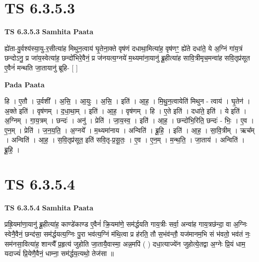 \documentclass[17pt]{extarticle}
\begin{document}
\section*{ TS 6.3.5.3 }

\textbf{TS 6.3.5.3 } \newline
\textbf{Samhita Paata} \newline

ह्ये॑ता-वु॒र्वश्य॑स्या॒यु-र॒सीत्या॑ह मिथुन॒त्वाय॑ घृ॒तेना॒क्ते वृष॑णं दधाथा॒मित्या॑ह॒ वृष॑णꣳ॒॒ ह्ये॑ते दधा॑ते॒ ये अ॒ग्निं गा॑य॒त्रं छन्दोऽनु॒ प्र जा॑य॒स्वेत्या॑ह॒ छन्दो॑भिरे॒वैनं॒ प्र ज॑नयत्य॒ग्नये॑ म॒थ्यमा॑ना॒यानु॑ ब्रू॒हीत्या॑ह सावि॒त्रीमृच॒मन्वा॑ह सवि॒तृप्र॑सूत ए॒वैनं॑ मन्थति जा॒तायानु॑ ब्रूहि- [  ] \newline

\textbf{Pada Paata} \newline

हि । ए॒तौ । उ॒र्वशी᳚ । अ॒सि॒ । आ॒युः । अ॒सि॒ । इति॑ । आ॒ह॒ । मि॒थु॒न॒त्वायेति॑ मिथुन - त्वाय॑ । घृ॒तेन॑ । अ॒क्ते इति॑ । वृष॑णम् । द॒धा॒था॒म् । इति॑ । आ॒ह॒ । वृष॑णम् । हि । ए॒ते इति॑ । दधा॑ते॒ इति॑ । ये इति॑ । अ॒ग्निम् । गा॒य॒त्रम् । छन्दः॑ । अनु॑ । प्रेति॑ । जा॒य॒स्व॒ । इति॑ । आ॒ह॒ । छन्दो॑भि॒रिति॒ छन्दः॑ - भिः॒ । ए॒व । ए॒न॒म् । प्रेति॑ । ज॒न॒य॒ति॒ । अ॒ग्नये᳚ । म॒थ्यमा॑नाय । अन्विति॑ । ब्रू॒हि॒ । इति॑ । आ॒ह॒ । सा॒वि॒त्रीम् । ऋच᳚म् । अन्विति॑ । आ॒ह॒ । स॒वि॒तृप्र॑सूत॒ इति॑ सवि॒तृ-प्र॒सू॒तः॒ । ए॒व । ए॒न॒म् । म॒न्थ॒ति॒ । जा॒ताय॑ । अन्विति॑ । ब्रू॒हि॒ ।  \newline




\section*{ TS 6.3.5.4 }

\textbf{TS 6.3.5.4 } \newline
\textbf{Samhita Paata} \newline

प्रह्रि॒यमा॑णा॒यानु॑ ब्रू॒हीत्या॑ह॒ काण्डे॑काण्ड ए॒वैनं॑ क्रि॒यमा॑णे॒ सम॑र्द्धयति गाय॒त्रीः सर्वा॒ अन्वा॑ह गाय॒त्रछ॑न्दा॒ वा अ॒ग्निः स्वेनै॒वैनं॒ छन्द॑सा॒ सम॑र्द्धयत्य॒ग्निः पु॒रा भव॑त्य॒ग्निं म॑थि॒त्वा प्र ह॑रति॒ तौ स॒भंव॑न्तौ॒ यज॑मानम॒भि सं भ॑वतो॒ भव॑तं नः॒ सम॑नसा॒वित्या॑ह॒ शान्त्यै᳚ प्र॒हृत्य॑ जुहोति जा॒तायै॒वास्मा॒ अन्न॒मपि॑ ( ) दधा॒त्याज्ये॑न जुहोत्ये॒तद्वा अ॒ग्नेः प्रि॒यं धाम॒ यदाज्यं॑ प्रि॒येणै॒वैनं॒ धाम्ना॒ सम॑र्द्धय॒त्यथो॒ तेज॑सा ॥ \newline
\end{document}
